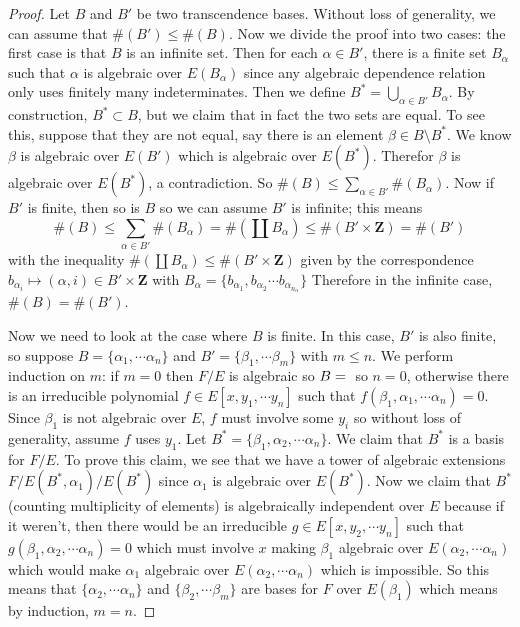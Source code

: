 \begin{proof}
Let $B$ and $B'$ be two transcendence bases. Without loss of generality, we can
assume that $\#(B')\leq \#(B)$. Now we divide the proof into two cases: the
first case is that $B$ is an infinite set. Then for each $\alpha\in B'$, there
is a finite set $B_{\alpha}$ such that $\alpha$ is algebraic over
$E(B_{\alpha})$ since any algebraic dependence relation only uses finitely many
indeterminates. Then we define $B^*=\bigcup_{\alpha\in B'} B_{\alpha}$. By
construction, $B^*\subset B$, but we claim that in fact the two sets are
equal. To see this, suppose that they are not equal, say there is an element
$\beta\in B\setminus B^*$. We know $\beta$ is algebraic over $E(B')$ which is
algebraic over $E(B^*)$. Therefor $\beta$ is algebraic over $E(B^*)$, a
contradiction. So $\#(B)\leq \sum_{\alpha\in B'} \#(B_{\alpha})$. Now if $B'$ is
finite, then so is $B$ so we can assume $B'$ is infinite; this means
\begin{equation} \#(B)\leq \sum_{\alpha\in B'}\#(B_{\alpha})=\#(\coprod
B_{\alpha})\leq \#(B'\times\mathbf{Z})=\#(B')\end{equation} with the inequality
$\#(\coprod
B_{\alpha}) \leq \#(B'\times \mathbf{Z})$ given by the correspondence
$b_{\alpha_i}\mapsto (\alpha,i)\in B'\times \mathbf{Z}$ with $B_\alpha =
\{b_{\alpha_1},b_{\alpha_2}\cdots b_{\alpha_{n_\alpha}}\}$ Therefore in the
infinite case, $\#(B)=\#(B')$.

Now we need to look at the case where $B$ is finite. In this case, $B'$ is also
finite, so suppose $B=\{\alpha_1,\cdots\alpha_n\}$ and
$B'=\{\beta_1,\cdots\beta_m\}$ with $m\leq n$. We perform induction on $m$: if
$m=0$ then $F/E$ is algebraic so $B=\null$ so $n=0$, otherwise there is an
irreducible polynomial $f\in E[x,y_1,\cdots y_n]$ such that
$f(\beta_1,\alpha_1,\cdots \alpha_n) = 0$. Since $\beta_1$ is not algebraic over
$E$, $f$ must involve some $y_i$ so without loss of generality, assume $f$ uses
$y_1$. Let $B^*=\{\beta_1,\alpha_2,\cdots\alpha_n\}$. We claim that $B^*$ is a
basis for $F/E$. To prove this claim, we see that we have a tower of algebraic
extensions $F/E(B^*,\alpha_1)/E(B^*)$ since $\alpha_1$ is algebraic over
$E(B^*)$. Now we claim that $B^*$ (counting multiplicity of elements) is
algebraically independent over $E$ because if it weren't, then there would be an
irreducible $g\in E[x,y_2,\cdots y_n]$ such that
$g(\beta_1,\alpha_2,\cdots\alpha_n)=0$ which must involve $x$ making $\beta_1$
algebraic over $E(\alpha_2,\cdots \alpha_n)$ which would make $\alpha_1$
algebraic over $E(\alpha_2,\cdots \alpha_n)$ which is impossible. So this means
that $\{\alpha_2,\cdots\alpha_n\}$ and $\{\beta_2,\cdots\beta_m\}$ are bases for
$F$ over $E(\beta_1)$ which means by induction, $m=n$. \end{proof}

